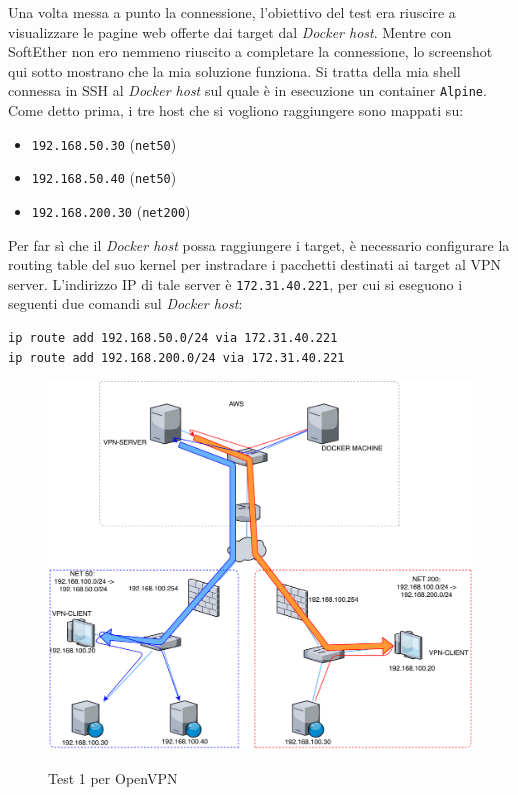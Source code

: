 Una volta messa a punto la connessione, l'obiettivo del test era riuscire a visualizzare
le pagine web offerte dai target dal \textit{Docker host}.
Mentre con SoftEther non ero nemmeno riuscito a completare la connessione, lo
screenshot qui sotto mostrano che la mia soluzione funziona. Si tratta della mia
shell connessa in SSH al \textit{Docker host} sul quale è in esecuzione un container
\texttt{Alpine}. Come detto prima, i tre host che si vogliono raggiungere sono
mappati su:
\begin{itemize}
  \item \texttt{192.168.50.30} (\texttt{net50})
  \item \texttt{192.168.50.40} (\texttt{net50})
  \item \texttt{192.168.200.30} (\texttt{net200})
\end{itemize}
Per far sì che il \textit{Docker host} possa raggiungere i target, è necessario
configurare la routing table del suo kernel per instradare i pacchetti destinati
ai target al VPN server. L'indirizzo IP di tale server è \texttt{172.31.40.221},
per cui si eseguono i seguenti due comandi sul \textit{Docker host}:
\begin{verbatim}
ip route add 192.168.50.0/24 via 172.31.40.221
ip route add 192.168.200.0/24 via 172.31.40.221
\end{verbatim}

\begin{figure}
  \includegraphics[scale=0.6]{img/openvpn_test1}
  \label{fig:openvpn-test1}
  \caption{Test 1 per OpenVPN}
\end{figure}

